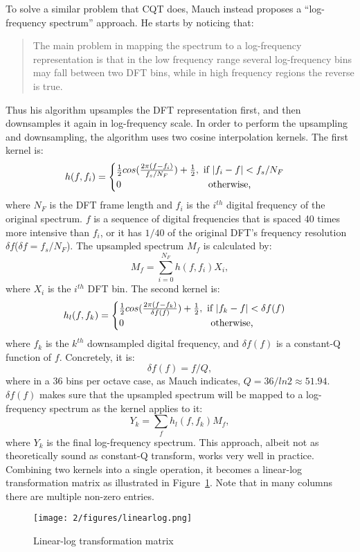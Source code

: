 To solve a similar problem that CQT does, Mauch \cite{mauch2010automatic} instead proposes a ``log-frequency spectrum'' approach. He starts by noticing that:
\begin{quote}
The main problem in mapping the spectrum to a log-frequency representation is that in the low frequency range several log-frequency bins may fall between two DFT bins, while in high frequency regions the reverse is true.
\end{quote}
Thus his algorithm upsamples the DFT representation first, and then downsamples it again in log-frequency scale. In order to perform the upsampling and downsampling, the algorithm uses two cosine interpolation kernels. The first kernel is:
\begin{equation}
h(f,f_i) = 
\begin{cases}
{1\over 2} cos ({2\pi (f-f_i) \over {f_s/N_F}}) + {1\over 2}, \text{ if } |f_i-f|<f_s/N_F\\
0 \quad\quad\quad\quad\quad\quad\quad\quad\quad\text{otherwise,}
\end{cases}
\end{equation}
where $N_F$ is the DFT frame length and $f_i$ is the $i^{th}$ digital frequency of the original spectrum. $f$ is a sequence of digital frequencies that is spaced 40 times more intensive than $f_i$, or it has $1/40$ of the original DFT's frequency resolution $\delta f$($\delta f=f_s/N_F$). The upsampled spectrum $M_f$ is calculated by:
\begin{equation}
M_f = \sum_{i=0}^{N_F} {h(f,f_i)X_i},
\end{equation}
where $X_i$ is the $i^{th}$ DFT bin. The second kernel is:
\begin{equation}
h_l(f,f_k) = 
\begin{cases}
{1\over 2} cos ({2\pi (f-f_k) \over {\delta f(f)}}) + {1\over 2}, \text{ if } |f_k-f|<\delta f(f)\\
0 \quad\quad\quad\quad\quad\quad\quad\quad\quad\text{otherwise,}
\end{cases}
\end{equation}
where $f_k$ is the $k^{th}$ downsampled digital frequency, and $\delta f(f)$ is a constant-Q function of $f$. Concretely, it is:
\begin{equation}
\delta f(f) = f/Q,
\end{equation}
where in a 36 bins per octave case, as Mauch indicates, $Q=36/ln2 \approx 51.94$. $\delta f(f)$ makes sure that the upsampled spectrum will be mapped to a log-frequency spectrum as the kernel applies to it:
\begin{equation}
Y_k = \sum_f h_l(f,f_k)M_f,
\end{equation}
where $Y_k$ is the final log-frequency spectrum. This approach, albeit not as theoretically sound as constant-Q transform, works very well in practice. Combining two kernels into a single operation, it becomes a linear-log transformation matrix as illustrated in Figure~\ref{fig:2-linearlog}. Note that in many columns there are multiple non-zero entries.
\begin{figure}[htb]
\centering
\texttt{[image: 2/figures/linearlog.png]}
\caption{Linear-log transformation matrix}
\label{fig:2-linearlog}
\end{figure}

